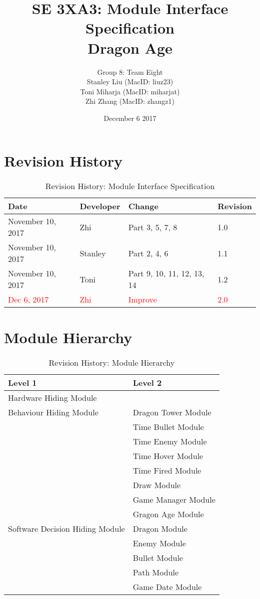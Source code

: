 \documentclass[12,english]{article}
\title{SE 3XA3: Module Interface Specification\\
        Dragon Age}
\author{Group 8: Team Eight \\
                 Stanley Liu (MacID: liuz23) \\    
                 Toni Miharja (MacID: miharjat)\\
                 Zhi Zhang (MacID: zhangz1)}
\date{December 6 2017 }
\begin{document}
\maketitle
\newpage
\tableofcontents
\newpage
 
\section{Revision History}
\begin{table}[h!]
    \centering
    \begin{tabular}{|p{2.5cm}|p{3cm}|p{3cm}|p{2cm}|}
    \hline
    \textbf {Date}  & {Developer} & {Change} & {Revision} \\
    \hline
    November 10, 2017 & Zhi & Part 3, 5, 7, 8 & 1.0\\
    \hline
    November 10, 2017 & Stanley & Part 2, 4, 6 & 1.1\\
    \hline
    November 10, 2017 & Toni & Part 9, 10, 11, 12, 13, 14& 1.2\\
    \hline
    \textcolor{red}{Dec 6, 2017} & \textcolor{red}{Zhi} & \textcolor{red}{Improve} & \textcolor{red}{2.0}\\
    \hline
    \end{tabular}
    \caption{Revision History: Module Interface Specification}
\end{table}
 
\section{Module Hierarchy}
\begin{table}[h!]
    \centering
    \begin{tabular}{|p{5.5cm}|p{5cm}|}
    \hline
    \textbf {Level 1}  & {Level 2} \\
    \hline
    Hardware Hiding Module &  \\
    \hline
    Behaviour Hiding Module & Dragon Tower Module\\
    & Time Bullet Module\\
    &Time Enemy Module\\
    &Time Hover Module\\
    &Time Fired Module\\
    &Draw Module\\
    &Game Manager Module\\
    &Gragon Age Module\\
    \hline
    Software Decision Hiding Module&Dragon Module\\
    & Enemy Module\\
    & Bullet Module\\
    & Path Module\\
    & Game Date Module\\
    \hline
    \end{tabular}
    \caption{Revision History: Module Hierarchy}
\end{table}
\end{document}
